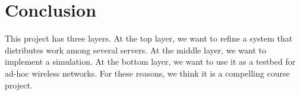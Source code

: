 \section{Conclusion}

This project has three layers. At the top layer, we want to refine a system that distributes work among several servers. At the middle layer, we want to implement a simulation. At the bottom layer, we want to use it as a testbed for ad-hoc wireless networks. For these reasons, we think it is a compelling course project.

